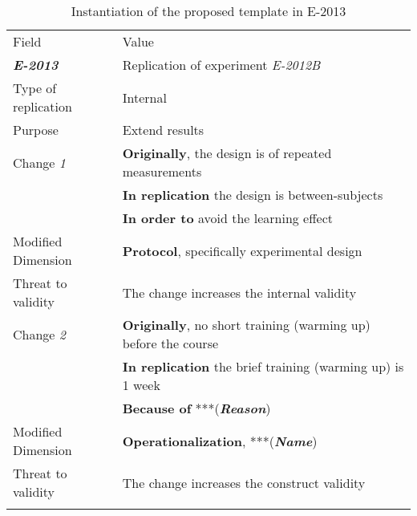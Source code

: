\begin{table*}[h]
  \caption{Instantiation of the proposed template in E-2013}
\label{tab:plantEng}
  \centering

\begin{tabularx}{\textwidth}{
  >{\hsize=0.3\hsize}X
  >{\hsize=0.8\hsize}X}
  
    \noalign{\smallskip}\hline\noalign{\smallskip}
  
  Field &  Value  \\ 
  \noalign{\smallskip}\hline\noalign{\smallskip}
  
\textbf {\textit{E-2013}} &  Replication of experiment \textit{E-2012B}    \\
Type of replication &  Internal   \\  
Purpose  &  Extend results \\   \hline

 Change \textit{1}   & \textbf{Originally}, the design is of repeated measurements \\& \textbf{In replication} the design is between-subjects \\& \textbf{In order to } avoid the learning effect \\ 

    Modified Dimension & 
    \textbf{Protocol}, specifically experimental design \\
    Threat to validity & The change increases the internal validity  \\  \hline
    
    Change \textit{2}   & \textbf{Originally}, no short training (warming up) before the course \\& \textbf{In replication} the brief training (warming up) is 1 week \\
    & \textbf{Because of}  ***(\textbf{\textit{Reason}})\\
    
    
    Modified Dimension & 
   \textbf{Operationalization}, ***(\textbf{\textit{Name}}) \\ 
    Threat to validity & The change increases the construct validity \\  
   \noalign{\smallskip\smallskip}\hline
    
	\end{tabularx}  
	
\end{table*}